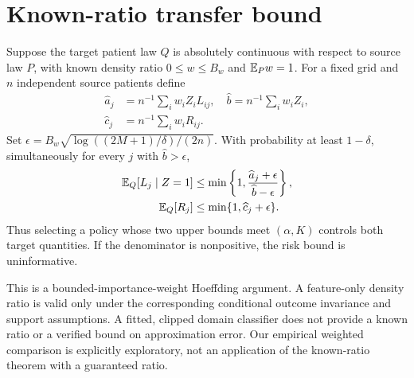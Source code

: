 \section*{Known-ratio transfer bound}
\begin{theorem}
Suppose the target patient law $Q$ is absolutely continuous with respect to source law $P$, with known density ratio $0\le w\le B_w$ and $\mathbb E_Pw=1$. For a fixed grid and $n$ independent source patients define
\[
 \begin{aligned}
 \widehat a_j&=n^{-1}\sum_i w_iZ_iL_{ij},\quad \widehat b=n^{-1}\sum_i w_iZ_i,\\
 \widehat c_j&=n^{-1}\sum_i w_iR_{ij}.
 \end{aligned}
\]
Set $\epsilon=B_w\sqrt{\log((2M+1)/\delta)/(2n)}$.
With probability at least $1-\delta$, simultaneously for every $j$ with $\widehat b>\epsilon$,
\[
 \begin{aligned}
 \mathbb E_Q[L_j\mid Z=1]&\le\min\left\{1,\frac{\widehat a_j+\epsilon}{\widehat b-\epsilon}\right\},\\
 \mathbb E_Q[R_j]&\le\min\{1,\widehat c_j+\epsilon\}.
 \end{aligned}
\]
Thus selecting a policy whose two upper bounds meet $(\alpha,K)$ controls both target quantities. If the denominator is nonpositive, the risk bound is uninformative.
\end{theorem}
This is a bounded-importance-weight Hoeffding argument. A feature-only density ratio is valid only under the corresponding conditional outcome invariance and support assumptions. A fitted, clipped domain classifier does not provide a known ratio or a verified bound on approximation error. Our empirical weighted comparison is explicitly exploratory, not an application of the known-ratio theorem with a guaranteed ratio.
